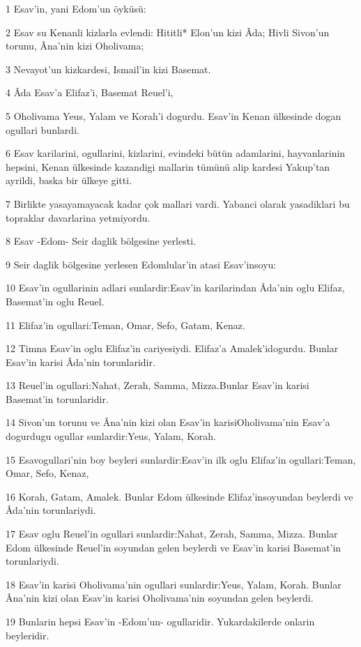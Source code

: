 \par 1 Esav'in, yani Edom'un öyküsü:
\par 2 Esav su Kenanli kizlarla evlendi: Hititli* Elon'un kizi Âda; Hivli Sivon'un torunu, Âna'nin kizi Oholivama;
\par 3 Nevayot'un kizkardesi, Ismail'in kizi Basemat.
\par 4 Âda Esav'a Elifaz'i, Basemat Reuel'i,
\par 5 Oholivama Yeus, Yalam ve Korah'i dogurdu. Esav'in Kenan ülkesinde dogan ogullari bunlardi.
\par 6 Esav karilarini, ogullarini, kizlarini, evindeki bütün adamlarini, hayvanlarinin hepsini, Kenan ülkesinde kazandigi mallarin tümünü alip kardesi Yakup'tan ayrildi, baska bir ülkeye gitti.
\par 7 Birlikte yasayamayacak kadar çok mallari vardi. Yabanci olarak yasadiklari bu topraklar davarlarina yetmiyordu.
\par 8 Esav -Edom- Seir daglik bölgesine yerlesti.
\par 9 Seir daglik bölgesine yerlesen Edomlular'in atasi Esav'insoyu:
\par 10 Esav'in ogullarinin adlari sunlardir:Esav'in karilarindan Âda'nin oglu Elifaz, Basemat'in oglu Reuel.
\par 11 Elifaz'in ogullari:Teman, Omar, Sefo, Gatam, Kenaz.
\par 12 Timna Esav'in oglu Elifaz'in cariyesiydi. Elifaz'a Amalek'idogurdu. Bunlar Esav'in karisi Âda'nin torunlaridir.
\par 13 Reuel'in ogullari:Nahat, Zerah, Samma, Mizza.Bunlar Esav'in karisi Basemat'in torunlaridir.
\par 14 Sivon'un torunu ve Âna'nin kizi olan Esav'in karisiOholivama'nin Esav'a dogurdugu ogullar sunlardir:Yeus, Yalam, Korah.
\par 15 Esavogullari'nin boy beyleri sunlardir:Esav'in ilk oglu Elifaz'in ogullari:Teman, Omar, Sefo, Kenaz,
\par 16 Korah, Gatam, Amalek. Bunlar Edom ülkesinde Elifaz'insoyundan beylerdi ve Âda'nin torunlariydi.
\par 17 Esav oglu Reuel'in ogullari sunlardir:Nahat, Zerah, Samma, Mizza. Bunlar Edom ülkesinde Reuel'in soyundan gelen beylerdi ve Esav'in karisi Basemat'in torunlariydi.
\par 18 Esav'in karisi Oholivama'nin ogullari sunlardir:Yeus, Yalam, Korah. Bunlar Âna'nin kizi olan Esav'in karisi Oholivama'nin soyundan gelen beylerdi.
\par 19 Bunlarin hepsi Esav'in -Edom'un- ogullaridir. Yukardakilerde onlarin beyleridir.
